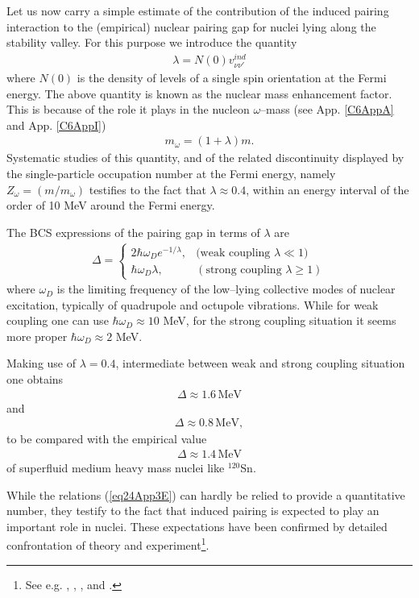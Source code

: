 Let us now carry a simple estimate of the contribution of the induced pairing interaction to the (empirical) nuclear pairing gap for nuclei lying along the stability valley. For this purpose we introduce the quantity
 \begin{align}
\lambda=N(0)v_{\nu\nu'}^{ind}
 \end{align}
where $N(0)$ is the density of levels of a single spin orientation at the Fermi energy. The above quantity is known as the nuclear mass enhancement factor. This is because of the role it plays in the nucleon $\omega$--mass (see App. \ref{C6AppA} and App. \ref{C6AppI})
 \begin{align}
m_\omega=(1+\lambda)m.
 \end{align}
Systematic studies of this quantity, and of the related discontinuity displayed by the single-particle occupation number at the Fermi energy, namely $Z_\omega=(m/m_\omega)$ testifies to the fact that $\lambda\approx0.4$, within an energy interval of the order of 10 MeV around the Fermi energy.


The BCS expressions of the pairing gap in terms of $\lambda$ are
\begin{align}\label{eq24App3E}
\Delta=\left\{\begin{array}{ll}
2\hbar\omega_De^{-1/\lambda},&\text{(weak coupling } \lambda\ll1)\\ 
\hbar\omega_D\lambda,&(\text{strong coupling }\lambda\geq1)
\end{array}
\right. 
\end{align}
where $\omega_D$ is the limiting frequency of the low--lying collective modes of nuclear excitation, typically of quadrupole and octupole vibrations. While for weak coupling one can use $\hbar\omega_D\approx10$ MeV, for the strong coupling situation it seems more proper $\hbar\omega_D\approx 2$ MeV.


Making use of $\lambda=0.4$, intermediate between weak and strong coupling situation one obtains
\begin{align}
\Delta\approx1.6\,\text{MeV}
\end{align}
and
\begin{align}
\Delta\approx0.8\,\text{MeV},
\end{align}
to be compared with the empirical value
\begin{align}
\Delta\approx1.4\,\text{MeV}
\end{align}
of superfluid medium heavy mass nuclei like $^{120}$Sn.

While the relations (\ref{eq24App3E}) can hardly be relied to provide a quantitative number, they testify to the fact that induced pairing is expected to play an important role in nuclei. These expectations have been confirmed by detailed confrontation of theory and experiment\footnote{See e.g. \cite{Barranco:99}, \cite{Terasaki:02b}, \cite{Barranco:05}, and \cite{Idini:15}.}.
